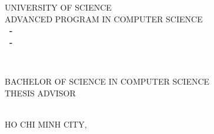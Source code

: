 \begin{titlepage}

\begin{center}
UNIVERSITY OF SCIENCE\\
ADVANCED PROGRAM IN COMPUTER SCIENCE\\[2cm]

{ \Large \bfseries \MakeUppercase{\tenSV ~-~ \mssv} \\
\Large \bfseries \MakeUppercase{\tenSVt ~-~ \mssvt} \\[2cm] } %

{ \LARGE \bfseries \MakeUppercase{\tenKL} \\[2cm] } %

\Large BACHELOR OF SCIENCE IN COMPUTER SCIENCE\\[2cm]

\Large THESIS ADVISOR\\
\MakeUppercase{\tenGVHD} \\[2cm]


\vfill
HO CHI MINH CITY, \the\year

\end{center}

\end{titlepage}
